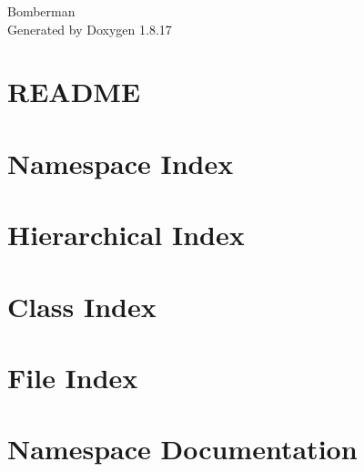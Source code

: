 \let\mypdfximage\pdfximage\def\pdfximage{\immediate\mypdfximage}\documentclass[twoside]{book}
\newcommand{\+}{\discretionary{\mbox{\scriptsize$\hookleftarrow$}}{}{}}
\newcommand{\clearemptydoublepage}{%
  \newpage{\pagestyle{empty}\cleardoublepage}%
}
\begin{document}
\hypersetup{pageanchor=false,
             bookmarksnumbered=true,
             pdfencoding=unicode
            }
\begin{titlepage}
\vspace*{7cm}
\begin{center}%
{\Large Bomberman }\\
\vspace*{1cm}
{\large Generated by Doxygen 1.8.17}\\
\end{center}
\end{titlepage}
\clearemptydoublepage
{}
\tableofcontents
\clearemptydoublepage
{}
\hypersetup{pageanchor=true}

\chapter{R\+E\+A\+D\+ME}
\label{md_README}

\chapter{Namespace Index}

\chapter{Hierarchical Index}

\chapter{Class Index}

\chapter{File Index}

\chapter{Namespace Documentation}










\end{document}
